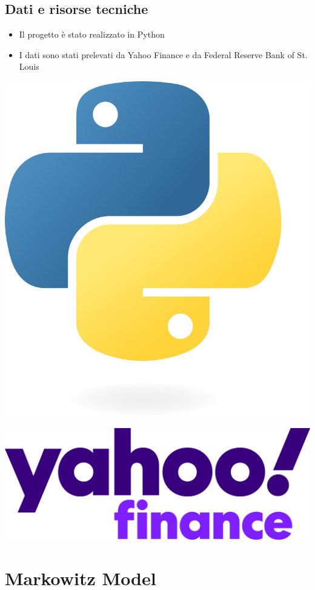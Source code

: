 \documentclass[compress]{beamer}
\begin{document}
\subsection{Dati e risorse tecniche}
\begin{frame}{\subsecname}
	\begin{itemize}
		\item Il progetto è stato realizzato in Python
		\item I dati sono stati prelevati da Yahoo Finance e da Federal Reserve Bank of St. Louis
	\end{itemize}
	\vspace{0.5cm}
	\begin{minipage}{0.3\textwidth}
		\centering
		\includegraphics[width=0.5\linewidth]{images/Python-logo.png}
	\end{minipage}
	\begin{minipage}{0.3\textwidth}
		\centering
		\includegraphics[width=0.7\linewidth]{images/Yahoo!_Finance_logo.png}
	\end{minipage}
	\begin{minipage}{0.3\textwidth}
		\centering
		
	\end{minipage}
\end{frame}

\section{Markowitz Model}
\end{document}
